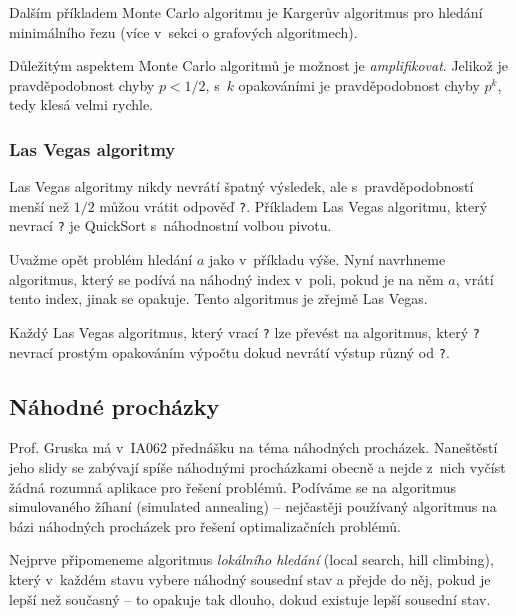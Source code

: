 Dalším příkladem Monte Carlo algoritmu je Kargerův algoritmus pro
hledání minimálního řezu (více v~sekci o grafových algoritmech).

Důležitým aspektem Monte Carlo algoritmů je možnost je {\em
amplifikovat}. Jelikož je pravděpodobnost chyby $p < 1/2$, s~$k$
opakováními je pravděpodobnost chyby $p^k$, tedy klesá velmi rychle.


\subsubsection{Las Vegas algoritmy}

Las Vegas algoritmy nikdy nevrátí špatný výsledek, ale
s~pravděpodobností menší než $1/2$ můžou
vrátit odpověď \verb|?|. Příkladem Las Vegas algoritmu, který nevrací
\verb|?| je QuickSort s~náhodnostní volbou pivotu.

\begin{example}
    Uvažme opět problém hledání $a$ jako v~příkladu výše.
    Nyní navrhneme algoritmus, který se podívá na náhodný index v~poli,
    pokud je na něm $a$, vrátí tento index, jinak se opakuje.
    Tento algoritmus je zřejmě Las Vegas.
\end{example}

Každý Las Vegas algoritmus, který vrací \verb|?| lze převést na
algoritmus, který \verb|?| nevrací prostým opakováním výpočtu dokud
nevrátí výstup různý od \verb|?|.


\subsection{Náhodné procházky}

Prof. Gruska má v~IA062 přednášku na téma náhodných procházek.
Naneštěstí jeho slidy se zabývají spíše náhodnými procházkami obecně
a nejde z~nich vyčíst žádná rozumná aplikace pro řešení problémů.
Podíváme se na algoritmus simulovaného žíhaní (simulated annealing) --
nejčastěji používaný algoritmus na bázi náhodných procházek pro řešení
optimalizačních problémů.

Nejprve připomeneme algoritmus {\em lokálního hledání} (local search,
hill climbing), který v~každém stavu vybere náhodný sousední stav a
přejde do něj, pokud je lepší než současný -- to opakuje tak dlouho,
dokud existuje lepší sousední stav.



